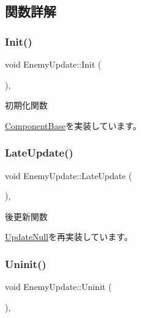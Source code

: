 \subsection{関数詳解}
\mbox{\label{class_enemy_update_a5b68696e964f71fca73c9143e3770c9d}} 
\subsubsection{\texorpdfstring{Init()}{Init()}}
{\footnotesize\ttfamily void Enemy\+Update\+::\+Init (\begin{DoxyParamCaption}{ }\end{DoxyParamCaption})\hspace{0.3cm}{\ttfamily [override]}, {\ttfamily [virtual]}}



初期化関数 



\mbox{\hyperlink{class_component_base_a125939d6befe42f28886a6523e86b18b}{Component\+Base}}を実装しています。

\mbox{\label{class_enemy_update_ae14e4ebb42ad9043534e53edcba5b242}} 
\subsubsection{\texorpdfstring{Late\+Update()}{LateUpdate()}}
{\footnotesize\ttfamily void Enemy\+Update\+::\+Late\+Update (\begin{DoxyParamCaption}{ }\end{DoxyParamCaption})\hspace{0.3cm}{\ttfamily [override]}, {\ttfamily [virtual]}}



後更新関数 



\mbox{\hyperlink{class_update_null_ac68da1ba7f3fbcae833442bb1c169200}{Update\+Null}}を再実装しています。

\mbox{\label{class_enemy_update_a294a5d4c65551af43e933cb65036f279}} 
\subsubsection{\texorpdfstring{Uninit()}{Uninit()}}
{\footnotesize\ttfamily void Enemy\+Update\+::\+Uninit (\begin{DoxyParamCaption}{ }\end{DoxyParamCaption})\hspace{0.3cm}{\ttfamily [override]}, {\ttfamily [virtual]}}



